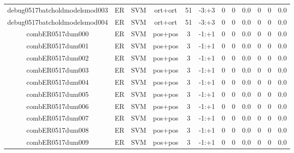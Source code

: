 \documentclass[a4paper]{article}
\begin{document}
\begin{landscape}
\begin{center}
\begin{tabular}{ |c|c|c|c|c|c|c|c|c|c|c|c|}
 
 	
 	\small{ debug0517batcholdmodelsmod003 } & ER & SVM & ort+ort  &  51 &  -3:+3  &  0 & 0 & 0.0  &  0 & 0 & 0.0 \\
 	

 
 	
 	\small{ debug0517batcholdmodelsmod004 } & ER & SVM & ort+ort  &  51 &  -3:+3  &  0 & 0 & 0.0  &  0 & 0 & 0.0 \\
 	

 
 	
 	\small{ combER0517dum000 } & ER & SVM & pos+pos  &  3 &  -1:+1  &  0 & 0 & 0.0  &  0 & 0 & 0.0 \\
 	

 
 	
 	\small{ combER0517dum001 } & ER & SVM & pos+pos  &  3 &  -1:+1  &  0 & 0 & 0.0  &  0 & 0 & 0.0 \\
 	

 
 	
 	\small{ combER0517dum002 } & ER & SVM & pos+pos  &  3 &  -1:+1  &  0 & 0 & 0.0  &  0 & 0 & 0.0 \\
 	

 
 	
 	\small{ combER0517dum003 } & ER & SVM & pos+pos  &  3 &  -1:+1  &  0 & 0 & 0.0  &  0 & 0 & 0.0 \\
 	

 
 	
 	\small{ combER0517dum004 } & ER & SVM & pos+pos  &  3 &  -1:+1  &  0 & 0 & 0.0  &  0 & 0 & 0.0 \\
 	

 
 	
 	\small{ combER0517dum005 } & ER & SVM & pos+pos  &  3 &  -1:+1  &  0 & 0 & 0.0  &  0 & 0 & 0.0 \\
 	

 
 	
 	\small{ combER0517dum006 } & ER & SVM & pos+pos  &  3 &  -1:+1  &  0 & 0 & 0.0  &  0 & 0 & 0.0 \\
 	

 
 	
 	\small{ combER0517dum007 } & ER & SVM & pos+pos  &  3 &  -1:+1  &  0 & 0 & 0.0  &  0 & 0 & 0.0 \\
 	

 
 	
 	\small{ combER0517dum008 } & ER & SVM & pos+pos  &  3 &  -1:+1  &  0 & 0 & 0.0  &  0 & 0 & 0.0 \\
 	

 
 	
 	\small{ combER0517dum009 } & ER & SVM & pos+pos  &  3 &  -1:+1  &  0 & 0 & 0.0  &  0 & 0 & 0.0 \\
 	


\end{tabular}
\end{center}
\end{landscape}
\end{document}
